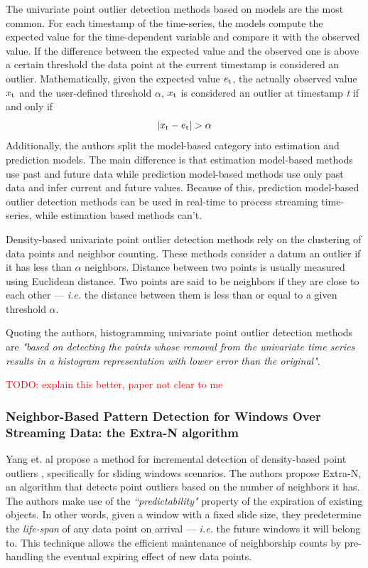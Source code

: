 The univariate point outlier detection methods based on models are the most common. For each timestamp of the time-series, the models compute the expected value for the time-dependent variable and compare it with the observed value. If the difference between the expected value and the observed one is above a certain threshold the data point at the current timestamp is considered an outlier. Mathematically, given the expected value $e\textsubscript{t}$, the actually observed value $x\textsubscript{t}$ and the user-defined threshold $\alpha$, $x\textsubscript{t}$ is considered an outlier at timestamp \textit{t} if and only if
\begin{equation*}
    |x\textsubscript{t}-e\textsubscript{t}|>\alpha
\end{equation*}
Additionally, the authors split the model-based category into estimation and prediction models. The main difference is that estimation model-based methods use past and future data while prediction model-based methods use only past data and infer current and future values. Because of this, prediction model-based outlier detection methods can be used in real-time to process streaming time-series, while estimation based methods can't.

Density-based univariate point outlier detection methods rely on the clustering of data points and neighbor counting. These methods consider a datum an outlier if it has less than $\alpha$ neighbors. Distance between two points is usually measured using Euclidean distance. Two points are said to be neighbors if they are close to each other --- \textit{i.e.} the distance between them is less than or equal to a given threshold $\alpha$.

Quoting the authors, histogramming univariate point outlier detection methods are \textit{"based on detecting the points whose removal from the univariate time series results in a histogram representation with lower error than the original"}.

\textcolor{red}{TODO: explain this better, paper not clear to me}


\subsubsection{Neighbor-Based Pattern Detection for Windows Over Streaming Data: the Extra-N algorithm} \label{alg:extran}

Yang et. al propose a method for incremental detection of density-based point outliers \cite{Yang-Neighbor-Based-Pattern-Detection}, specifically for sliding windows scenarios. The authors propose Extra-N, an algorithm that detects point outliers based on the number of neighbors it has. The authors make use of the \textit{“predictability"} property of the expiration of existing objects. In other words, given a window with a fixed slide size, they predetermine the \textit{life-span} of any data point on arrival --- \textit{i.e.} the future windows it will belong to. This technique allows the efficient maintenance of neighborship counts by pre-handling the eventual expiring effect of new data points.

